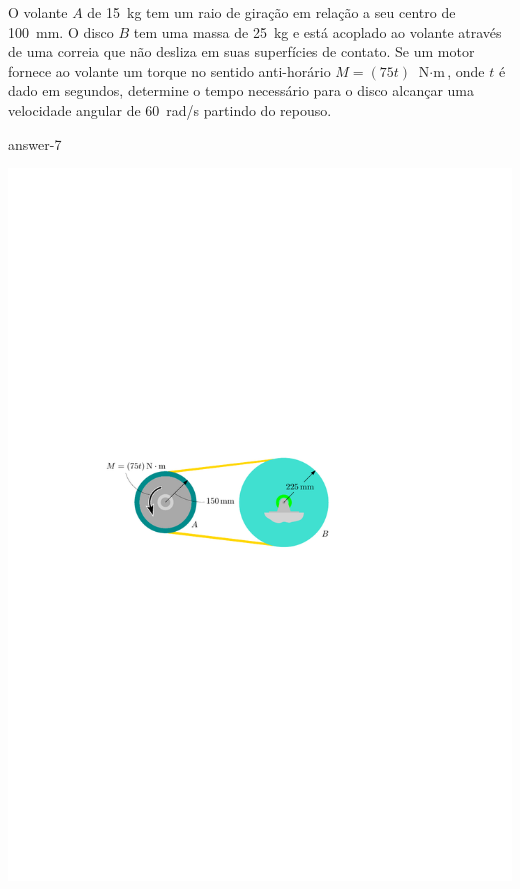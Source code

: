 \item O volante $A$ de \SI{15}{\kilogram} tem um raio de giração em relação a seu centro de \SI{100}{\milli\meter}. O disco $B$ tem uma massa de \SI{25}{\kilogram} e está acoplado ao volante através de uma correia que não desliza em suas superfícies de contato. Se um motor fornece ao volante um torque no sentido anti-horário $M=(75t)\,\SI{}{\newton\cdot\meter}$, onde $t$ é dado em segundos, determine o tempo necessário para o disco alcançar uma velocidade angular de \SI{60}{\radian/\second} partindo do repouso.

{answer-7}

\begin{flushright}
	\includegraphics[scale=1.1]{../../images/draw_4}
\end{flushright}
